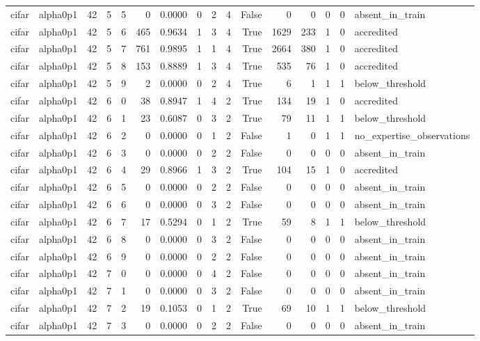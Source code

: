 \begin{tabular}{llrrrrrrrrrrrrrl}
cifar & alpha0p1 & 42 & 5 & 5 & 0 & 0.0000 & 0 & 2 & 4 & False & 0 & 0 & 0 & 0 & absent\_in\_train \\
cifar & alpha0p1 & 42 & 5 & 6 & 465 & 0.9634 & 1 & 3 & 4 & True & 1629 & 233 & 1 & 0 & accredited \\
cifar & alpha0p1 & 42 & 5 & 7 & 761 & 0.9895 & 1 & 1 & 4 & True & 2664 & 380 & 1 & 0 & accredited \\
cifar & alpha0p1 & 42 & 5 & 8 & 153 & 0.8889 & 1 & 3 & 4 & True & 535 & 76 & 1 & 0 & accredited \\
cifar & alpha0p1 & 42 & 5 & 9 & 2 & 0.0000 & 0 & 2 & 4 & True & 6 & 1 & 1 & 1 & below\_threshold \\
cifar & alpha0p1 & 42 & 6 & 0 & 38 & 0.8947 & 1 & 4 & 2 & True & 134 & 19 & 1 & 0 & accredited \\
cifar & alpha0p1 & 42 & 6 & 1 & 23 & 0.6087 & 0 & 3 & 2 & True & 79 & 11 & 1 & 1 & below\_threshold \\
cifar & alpha0p1 & 42 & 6 & 2 & 0 & 0.0000 & 0 & 1 & 2 & False & 1 & 0 & 1 & 1 & no\_expertise\_observations \\
cifar & alpha0p1 & 42 & 6 & 3 & 0 & 0.0000 & 0 & 2 & 2 & False & 0 & 0 & 0 & 0 & absent\_in\_train \\
cifar & alpha0p1 & 42 & 6 & 4 & 29 & 0.8966 & 1 & 3 & 2 & True & 104 & 15 & 1 & 0 & accredited \\
cifar & alpha0p1 & 42 & 6 & 5 & 0 & 0.0000 & 0 & 2 & 2 & False & 0 & 0 & 0 & 0 & absent\_in\_train \\
cifar & alpha0p1 & 42 & 6 & 6 & 0 & 0.0000 & 0 & 3 & 2 & False & 0 & 0 & 0 & 0 & absent\_in\_train \\
cifar & alpha0p1 & 42 & 6 & 7 & 17 & 0.5294 & 0 & 1 & 2 & True & 59 & 8 & 1 & 1 & below\_threshold \\
cifar & alpha0p1 & 42 & 6 & 8 & 0 & 0.0000 & 0 & 3 & 2 & False & 0 & 0 & 0 & 0 & absent\_in\_train \\
cifar & alpha0p1 & 42 & 6 & 9 & 0 & 0.0000 & 0 & 2 & 2 & False & 0 & 0 & 0 & 0 & absent\_in\_train \\
cifar & alpha0p1 & 42 & 7 & 0 & 0 & 0.0000 & 0 & 4 & 2 & False & 0 & 0 & 0 & 0 & absent\_in\_train \\
cifar & alpha0p1 & 42 & 7 & 1 & 0 & 0.0000 & 0 & 3 & 2 & False & 0 & 0 & 0 & 0 & absent\_in\_train \\
cifar & alpha0p1 & 42 & 7 & 2 & 19 & 0.1053 & 0 & 1 & 2 & True & 69 & 10 & 1 & 1 & below\_threshold \\
cifar & alpha0p1 & 42 & 7 & 3 & 0 & 0.0000 & 0 & 2 & 2 & False & 0 & 0 & 0 & 0 & absent\_in\_train \\

\end{tabular}
